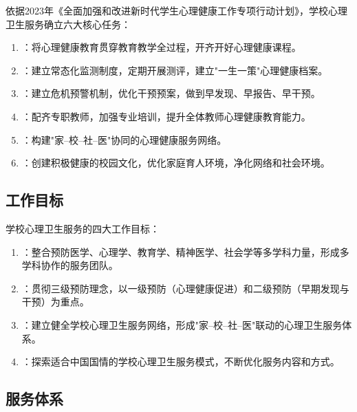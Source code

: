 \begin{keybox}
依据2023年《全面加强和改进新时代学生心理健康工作专项行动计划》，学校心理卫生服务确立六大核心任务：

\begin{enumerate}[leftmargin=*]
    \item {}：将心理健康教育贯穿教育教学全过程，开齐开好心理健康课程。
    \item {}：建立常态化监测制度，定期开展测评，建立"一生一策"心理健康档案。
    \item {}：建立危机预警机制，优化干预预案，做到早发现、早报告、早干预。
    \item {}：配齐专职教师，加强专业培训，提升全体教师心理健康教育能力。
    \item {}：构建"家--校--社--医"协同的心理健康服务网络。
    \item {}：创建积极健康的校园文化，优化家庭育人环境，净化网络和社会环境。
\end{enumerate}
\end{keybox}

\subsection{工作目标}

\begin{keybox}
学校心理卫生服务的四大工作目标：

\begin{enumerate}[leftmargin=*]
    \item {}：整合预防医学、心理学、教育学、精神医学、社会学等多学科力量，形成多学科协作的服务团队。
    \item {}：贯彻三级预防理念，以一级预防（心理健康促进）和二级预防（早期发现与干预）为重点。
    \item {}：建立健全学校心理卫生服务网络，形成"家--校--社--医"联动的心理卫生服务体系。
    \item {}：探索适合中国国情的学校心理卫生服务模式，不断优化服务内容和方式。
\end{enumerate}
\end{keybox}

\subsection{服务体系}

